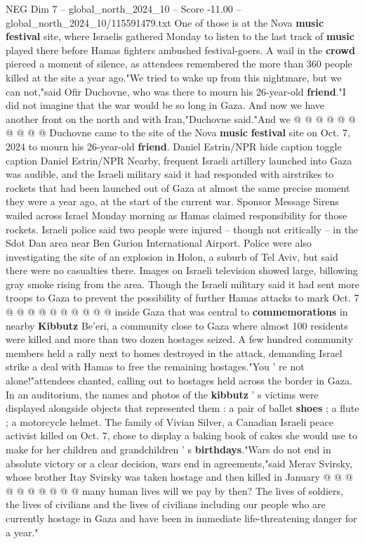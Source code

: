 \begin{textsample}{NEG Dim 7 – global\_north\_2024\_10 – Score -11.00 – global\_north\_2024\_10/115591479.txt}
One of those is at the Nova \textbf{music} \textbf{festival} site, where Israelis gathered Monday to listen to the last track of \textbf{music} played there before Hamas fighters ambushed festival-goers.
A wail in the \textbf{crowd} pierced a moment of silence, as attendees remembered the more than 360 people killed at the site a year ago."We tried to wake up from this nightmare, but we can not,"said Ofir Duchovne, who was there to mourn his 26-year-old \textbf{friend}."I did not imagine that the war would be so long in Gaza.
And now we have another front on the north and with Iran,"Duchovne said."And we @ @ @ @ @ @ @ @ @ @ Duchovne came to the site of the Nova \textbf{music} \textbf{festival} site on Oct. 7, 2024 to mourn his 26-year-old \textbf{friend}.
Daniel Estrin/NPR hide caption toggle caption Daniel Estrin/NPR Nearby, frequent Israeli artillery launched into Gaza was audible, and the Israeli military said it had responded with airstrikes to rockets that had been launched out of Gaza at almost the same precise moment they were a year ago, at the start of the current war.
Sponsor Message Sirens wailed across Israel Monday morning as Hamas claimed responsibility for those rockets.
Israeli police said two people were injured -- though not critically -- in the Sdot Dan area near Ben Gurion International Airport.
Police were also investigating the site of an explosion in Holon, a suburb of Tel Aviv, but said there were no casualties there.
Images on Israeli television showed large, billowing gray smoke rising from the area.
Though the Israeli military said it had sent more troops to Gaza to prevent the possibility of further Hamas attacks to mark Oct. 7 @ @ @ @ @ @ @ @ @ @ inside Gaza that was central to \textbf{commemorations} in nearby \textbf{Kibbutz} Be'eri, a community close to Gaza where almost 100 residents were killed and more than two dozen hostages seized.
A few hundred community members held a rally next to homes destroyed in the attack, demanding Israel strike a deal with Hamas to free the remaining hostages."You ' re not alone!"attendees chanted, calling out to hostages held across the border in Gaza.
In an auditorium, the names and photos of the \textbf{kibbutz} ' s victims were displayed alongside objects that represented them : a pair of ballet \textbf{shoes} ; a flute ; a motorcycle helmet.
The family of Vivian Silver, a Canadian Israeli peace activist killed on Oct. 7, chose to display a baking book of cakes she would use to make for her children and grandchildren ' s \textbf{birthdays}."Wars do not end in absolute victory or a clear decision, wars end in agreements,"said Merav Svirsky, whose brother Itay Svirsky was taken hostage and then killed in January @ @ @ @ @ @ @ @ @ @ many human lives will we pay by then?
The lives of soldiers, the lives of civilians and the lives of civilians including our people who are currently hostage in Gaza and have been in immediate life-threatening danger for a year."

\end{textsample}
